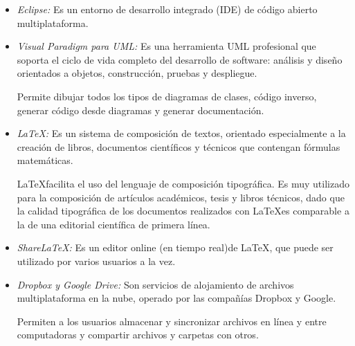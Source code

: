 \begin{itemize}

\item \emph {Eclipse:} Es un entorno de desarrollo integrado (IDE) de código abierto multiplataforma.

\item \emph {Visual Paradigm para UML:} Es una herramienta UML profesional que soporta el ciclo de vida completo del desarrollo de software: análisis y diseño orientados a objetos, construcción, pruebas y despliegue. 

Permite dibujar todos los tipos de diagramas de clases, código inverso, generar código desde diagramas y generar documentación.

\item \emph{\LaTeX:} Es un sistema de composición de textos, orientado especialmente a la creación de libros, documentos científicos y técnicos que contengan fórmulas matemáticas.

\LaTeX facilita el uso del lenguaje de composición tipográfica. Es muy utilizado para la composición de artículos académicos, tesis y libros técnicos, dado que la calidad tipográfica de los documentos realizados con \LaTeX es comparable a la de una editorial científica de primera línea.



\item \emph{ShareLaTeX:} Es un editor online (en tiempo real)de \LaTeX, que puede ser utilizado por varios usuarios a la vez. 

\item \emph{Dropbox y Google Drive:} Son servicios de alojamiento de archivos multiplataforma en la nube, operado por las compañías Dropbox y Google. 

Permiten a los usuarios almacenar y sincronizar archivos en línea y entre computadoras y compartir archivos y carpetas con otros.

\end{itemize}

